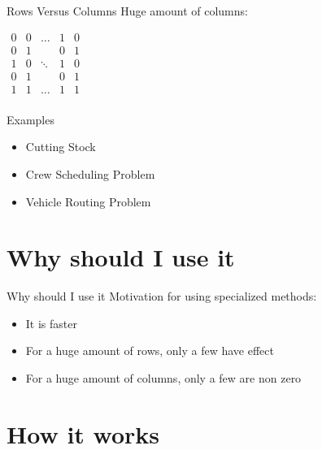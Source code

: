 \documentclass{beamer}
\begin{document}
\begin{frame}{Rows Versus Columns}
    Huge amount of columns:

    \begin{minipage}{0.49\textwidth}
    $
     \begin{matrix}
      0 & 0 & \hdots & 1 & 0 \\
      0 & 1 &        & 0 & 1 \\
      1 & 0 & \ddots & 1 & 0 \\
      0 & 1 &        & 0 & 1 \\
      1 & 1 & \hdots & 1 & 1 \\
     \end{matrix}
    $
    \end{minipage}
    \begin{minipage}{0.49\textwidth}
    Examples
    \begin{itemize}
        \item Cutting Stock
        \item Crew Scheduling Problem
        \item Vehicle Routing Problem
    \end{itemize}
    \end{minipage}
\end{frame}

\section{Why should I use it}

\begin{frame}{Why should I use it}
    Motivation for using specialized methods:
    \begin{itemize}
        \item It is faster
        \item For a huge amount of rows, only a few have effect
        \item For a huge amount of columns, only a few are non zero
    \end{itemize}
\end{frame}

\section{How it works}
\end{document}
